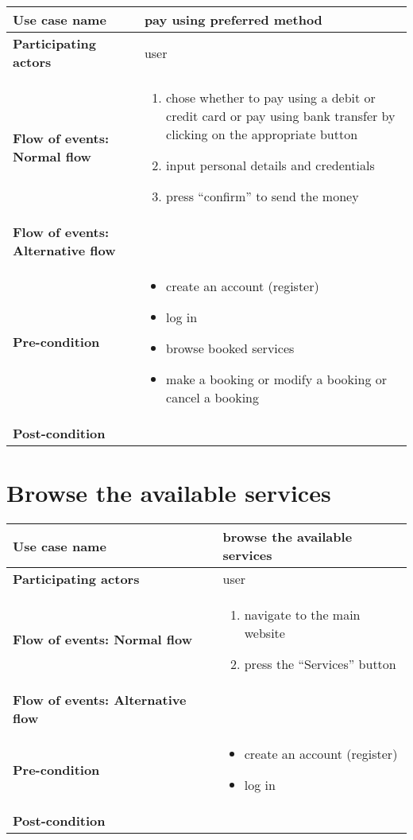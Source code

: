 \documentclass[a4paper, 13pt, draft]{report}
\begin{document}
\begin{center}
    \begin{tabular}{| >{\bf}l | p{5.55cm} |} 
	\hline
	Use case name & pay using preferred method \\ 
	\hline
	Participating actors & user \\
	\hline
	Flow of events: Normal flow & 
	\begin{enumerate}		
	    \item chose whether to pay using a debit or credit card or pay using bank transfer by clicking on the appropriate button
	    \item input personal details and credentials
	    \item press ``confirm'' to send the money
	\end{enumerate}	\\
	\hline
	Flow of events: Alternative flow & \notapplicable \\
	\hline
	Pre-condition & 
	\begin{itemize} 
	    \item create an account (register)
	    \item log in
	    \item browse booked services
	    \item make a booking or modify a booking or cancel a booking
	\end{itemize} \\
	\hline
	Post-condition & \notapplicable \\
	\hline
    \end{tabular}
\end{center}

\section*{Browse the available services}

\begin{center}
    \begin{tabular}{| >{\bf}l | p{5.55cm} |} 
	\hline
	Use case name & browse the available services \\ 
	\hline
	Participating actors & user \\
	\hline
	Flow of events: Normal flow & 
	\begin{enumerate}		
	    \item navigate to the main website
	    \item press the ``Services'' button
	\end{enumerate}	\\
	\hline
	Flow of events: Alternative flow & \notapplicable \\
	\hline
	Pre-condition & 
	\begin{itemize} 
	    \item create an account (register)
	    \item log in
	\end{itemize} \\
	\hline
	Post-condition & \notapplicable \\
	\hline
    \end{tabular}
\end{center}
\end{document}
